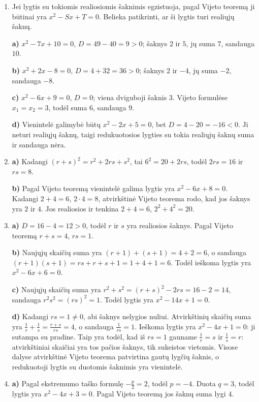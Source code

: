 \documentclass[12pt,a4paper]{article}
\begin{document}
\begin{enumerate}
\textbf{a)} $S=2+5=7$, $T=2\cdot5=10$; $x^2-7x+10=0$.

\textbf{b)} $S=-3+4=1$, $T=(-3)\cdot4=-12$; $x^2-x-12=0$.

\textbf{c)} $S=-2-6=-8$, $T=(-2)(-6)=12$; $x^2+8x+12=0$.

\textbf{d)} $S=0-5=-5$, $T=0\cdot(-5)=0$; $x^2+5x=0$.

\textbf{e)} $S=3+3=6$, $T=3\cdot3=9$; $x^2-6x+9=0$. Tai viena dviguboji šaknis $3$.

\textbf{f)} $S=2+\frac{1}{2}=\frac{5}{2}$, $T=2\cdot\frac{1}{2}=1$; $x^2-\frac{5}{2}x+1=0$.
\item Jei lygtis su tokiomis realiosiomis šaknimis egzistuoja, pagal Vijeto teoremą ji būtinai yra $x^2-Sx+T=0$. Belieka patikrinti, ar ši lygtis turi realiųjų šaknų.

\textbf{a)} $x^2-7x+10=0$, $D=49-40=9>0$; šaknys $2$ ir $5$, jų suma $7$, sandauga $10$.

\textbf{b)} $x^2+2x-8=0$, $D=4+32=36>0$; šaknys $2$ ir $-4$, jų suma $-2$, sandauga $-8$.

\textbf{c)} $x^2-6x+9=0$, $D=0$; viena dviguboji šaknis $3$. Vijeto formulėse $x_1=x_2=3$, todėl suma $6$, sandauga $9$.

\textbf{d)} Vienintelė galimybė būtų $x^2-2x+5=0$, bet $D=4-20=-16<0$. Ji neturi realiųjų šaknų, taigi redukuotosios lygties su tokia realiųjų šaknų suma ir sandauga nėra.
\item \textbf{a)} Kadangi $(r+s)^2=r^2+2rs+s^2$, tai $6^2=20+2rs$, todėl $2rs=16$ ir $rs=8$.

\textbf{b)} Pagal Vijeto teoremą vienintelė galima lygtis yra $x^2-6x+8=0$. Kadangi $2+4=6$, $2\cdot4=8$, atvirkštinė Vijeto teorema rodo, kad jos šaknys yra $2$ ir $4$. Jos realiosios ir tenkina $2+4=6$, $2^2+4^2=20$.
\item \textbf{a)} $D=16-4=12>0$, todėl $r$ ir $s$ yra realiosios šaknys. Pagal Vijeto teoremą $r+s=4$, $rs=1$.

\textbf{b)} Naujųjų skaičių suma yra $(r+1)+(s+1)=4+2=6$, o sandauga $(r+1)(s+1)=rs+r+s+1=1+4+1=6$. Todėl ieškoma lygtis yra $x^2-6x+6=0$.

\textbf{c)} Naujųjų skaičių suma yra $r^2+s^2=(r+s)^2-2rs=16-2=14$, sandauga $r^2s^2=(rs)^2=1$. Todėl lygtis yra $x^2-14x+1=0$.

\textbf{d)} Kadangi $rs=1\ne0$, abi šaknys nelygios nuliui. Atvirkštinių skaičių suma yra $\frac{1}{r}+\frac{1}{s}=\frac{r+s}{rs}=4$, o sandauga $\frac{1}{rs}=1$. Ieškoma lygtis yra $x^2-4x+1=0$: ji sutampa su pradine. Taip yra todėl, kad iš $rs=1$ gauname $\frac{1}{r}=s$ ir $\frac{1}{s}=r$: atvirkštiniai skaičiai yra tos pačios šaknys, tik sukeistos vietomis. Visose dalyse atvirkštinė Vijeto teorema patvirtina gautų lygčių šaknis, o redukuotoji lygtis su duotomis šaknimis yra vienintelė.
\item \textbf{a)} Pagal ekstremumo taško formulę $-\frac{p}{2}=2$, todėl $p=-4$. Duota $q=3$, todėl lygtis yra $x^2-4x+3=0$. Pagal Vijeto teoremą jos šaknų suma lygi $4$.


\end{enumerate}
\end{document}
